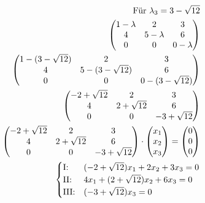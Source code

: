 \begin{align*}
    \text{Für } \lambda_3 = 3 - \sqrt{12} \\
    \begin{pmatrix}
        1 - \lambda & 2 & 3 \\
        4 & 5 - \lambda & 6 \\
        0 & 0 & 0 - \lambda
    \end{pmatrix} \\
    \begin{pmatrix}
        1 - (3 - \sqrt{12}) & 2 & 3 \\
        4 & 5 - (3 - \sqrt{12}) & 6 \\
        0 & 0 & 0 - (3 - \sqrt{12})
    \end{pmatrix} \\
    \begin{pmatrix}
        -2 + \sqrt{12} & 2 & 3 \\
        4 & 2 + \sqrt{12} & 6 \\
        0 & 0 & -3 + \sqrt{12}
    \end{pmatrix} \\
    \begin{pmatrix}
        -2 + \sqrt{12} & 2 & 3 \\
        4 & 2 + \sqrt{12} & 6 \\
        0 & 0 & -3 + \sqrt{12}
    \end{pmatrix} \cdot \begin{pmatrix}
        x_1 \\ x_2 \\ x_3
    \end{pmatrix} = \begin{pmatrix}
        0 \\ 0 \\ 0
    \end{pmatrix}\\
    \begin{cases}
        \text{I:\@} & (-2 + \sqrt{12})x_1 + 2x_2 + 3x_3 = 0 \\
        \text{II:\@} & 4x_1 + (2 + \sqrt{12})x_2 + 6x_3 = 0 \\
        \text{III:\@} & (-3 + \sqrt{12})x_3 = 0
    \end{cases}
\end{align*}

